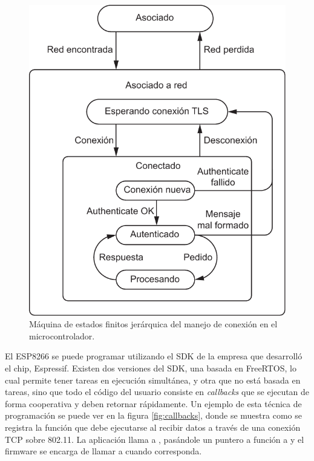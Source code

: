 \begin{figure}[ht!]
	\begin{center}
		\centering
		\includegraphics[scale=0.8]{imagenes/fsm-micro.pdf}
		\caption{Máquina de estados finitos jerárquica del manejo de conexión en el microcontrolador.}
		\label{fig:fsm-micro}
	\end{center}
\end{figure}

El ESP8266 se puede programar utilizando el SDK de la empresa que desarrolló el chip, Espressif. Existen dos versiones del SDK, una basada en FreeRTOS, lo cual permite tener tareas en ejecución simultánea, y otra que no está basada en tareas, sino que todo el código del usuario consiste en \emph{callbacks} que se ejecutan de forma cooperativa y deben retornar rápidamente. Un ejemplo de esta técnica de programación se puede ver en la figura \ref{fig:callbacks}, donde se muestra como se registra la función que debe ejecutarse al recibir datos a través de una conexión TCP sobre 802.11. La aplicación llama a , pasándole un puntero a función a  y el firmware se encarga de llamar a  cuando corresponda.

